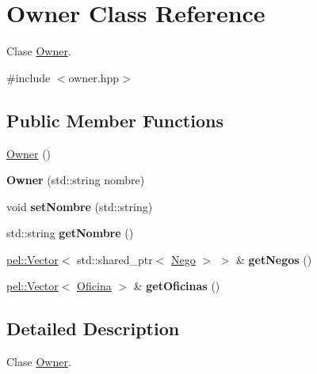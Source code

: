 \hypertarget{classOwner}{}\section{Owner Class Reference}
\label{classOwner}


Clase \hyperlink{classOwner}{Owner}.  




{\ttfamily \#include $<$owner.\+hpp$>$}

\subsection*{Public Member Functions}
\begin{DoxyCompactItemize}
\item 
\hyperlink{classOwner_ab9186e9839a04fe48baad103cc1d0ddb}{Owner} ()
\item 
\hypertarget{classOwner_a876e5d2ec5c7f0474ac61ae18256a78d}{}{\bfseries Owner} (std\+::string nombre)\label{classOwner_a876e5d2ec5c7f0474ac61ae18256a78d}

\item 
\hypertarget{classOwner_a6b7345e565bfcfde59b1871147765535}{}void {\bfseries set\+Nombre} (std\+::string)\label{classOwner_a6b7345e565bfcfde59b1871147765535}

\item 
\hypertarget{classOwner_a13cd3eb4f058bfb2ea1d4ba05c61f5b8}{}std\+::string {\bfseries get\+Nombre} ()\label{classOwner_a13cd3eb4f058bfb2ea1d4ba05c61f5b8}

\item 
\hypertarget{classOwner_a67ce178f90b13ceef02c85f8c7bacfe9}{}\hyperlink{classpel_1_1Vector}{pel\+::\+Vector}$<$ std\+::shared\+\_\+ptr$<$ \hyperlink{classNego}{Nego} $>$ $>$ \& {\bfseries get\+Negos} ()\label{classOwner_a67ce178f90b13ceef02c85f8c7bacfe9}

\item 
\hypertarget{classOwner_a2da9d5e9fbd32e26635f17e0a1a06545}{}\hyperlink{classpel_1_1Vector}{pel\+::\+Vector}$<$ \hyperlink{classOficina}{Oficina} $>$ \& {\bfseries get\+Oficinas} ()\label{classOwner_a2da9d5e9fbd32e26635f17e0a1a06545}

\end{DoxyCompactItemize}


\subsection{Detailed Description}
Clase \hyperlink{classOwner}{Owner}. 

